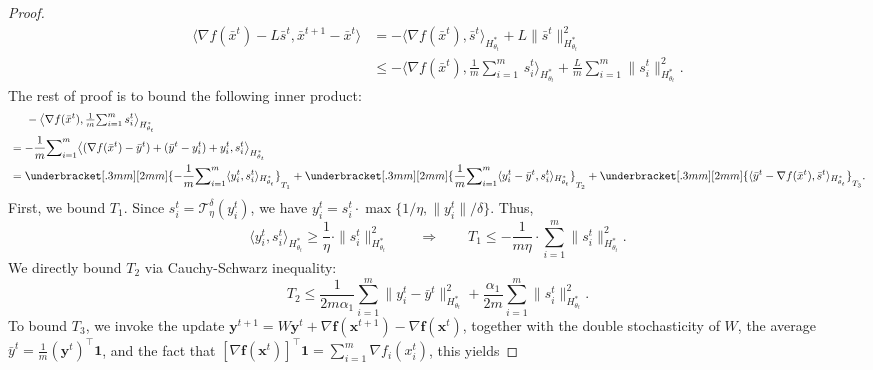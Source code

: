 \documentclass{article}
\theoremstyle{plain}
\theoremstyle{definition}
\theoremstyle{remark}
\newcommand{\clip}{\mathcal{T}^\delta_\eta}
\newcommand{\sL}{L}
\newcommand{\one}{\mathbf{1}}
\newcommand{\bx}{\mathbf{x}}
\newcommand{\by}{\mathbf{y}}
\newcommand{\bff}{\mathbf{f}}
\begin{document}
\begin{proof}
\begin{equation}
        \label{eq:inner product 1}
   \begin{aligned}
     \langle \nabla f(\bar x^t) - \sL \bar s^t, \bar x^{t+1} - \bar x^t \rangle &= 
       -\langle \nabla f(\bar x^t), \bar s^t \rangle_{H_{\theta_t}^*} +  \sL \|\bar s^t\|^2_{H_{\theta_t}^*}\\
       &\leq -\big \langle \nabla f(\bar x^t), \tfrac1m {\textstyle \sum}_{i=1}^m \, s_i^t \big \rangle_{H_{\theta_t}^*} + \frac{\sL}{m}{\sum}_{i=1}^m \|s_i^t\|^2_{H_{\theta_t}^*}.
   \end{aligned}
   \end{equation}
   The rest of proof is to bound the following inner product:
   \begin{equation}
        \label{eq:inner product 2}
        \begin{aligned}
           & \hspace{5mm} -\big \langle \nabla f(\bar x^t), \tfrac1m {\textstyle \sum}_{i=1}^m \, s_i^t \big \rangle_{H_{\theta_t}^*} \\
           &= - \frac1m {\sum}_{i=1}^m 
            \big\langle (\nabla f(\bar x^t) - \bar y^t) + (\bar y^t - y_i^t) + y_i^t , s_i^t \big\rangle_{H_{\theta_t}^*} \\
            &= \underbracket[.3mm][2mm]{- \frac1m {\sum}_{i=1}^m \langle y_i^t , s_i^t\rangle_{H_{\theta_t}^*}}_{T_1} + \underbracket[.3mm][2mm]{\frac1m {\sum}_{i=1}^m \langle y_i^t - \bar y^t, s_i^t \rangle_{H_{\theta_t}^*}}_{T_2} + \underbracket[.3mm][2mm]{\langle \bar y^t - \nabla f(\bar x^t), \bar s^t \rangle_{H_{\theta_t}^*}}_{T_3}.
        \end{aligned}
    \end{equation}
    First, we bound $T_1$. Since $s_i^t=\clip(y_i^t)$, we have $y_i^t=s_i^t\cdot \max\{1/\eta,\|y_i^t\|/\delta\}$. Thus, 
    \begin{equation}
        \label{eq:bound T1}
        \langle y_i^t, s_i^t \rangle_{H_{\theta_t}^*} \geq \frac1\eta \cdot \|s_i^t\|^2_{H_{\theta_t}^*} \qquad \Longrightarrow \qquad T_1 \leq -\frac{1}{m\eta} \cdot {\sum}_{i=1}^m\|s_i^t\|^2_{H_{\theta_t}^*}.
    \end{equation}
We directly bound $T_2$ via Cauchy-Schwarz inequality:
    \begin{equation}
        \label{eq:bound T2}
        T_2 \leq \frac{1}{2m \alpha_1} {\sum}_{i=1}^m\|y_i^t - \bar y^t\|^2_{H_{\theta_t}^*} + \frac{\alpha_1}{2m} {\sum}_{i=1}^m\|s_i^t\|^2_{H_{\theta_t}^*}.
    \end{equation}
    To bound $T_3$, we invoke the update $\by^{t+1} = W \by^t + \nabla \bff(\bx^{t+1}) - \nabla \bff(\bx^{t})$, together with the double stochasticity of $W$, the average $\bar y^t = \frac{1}{m} (\by^t)^\top \one$, and the fact that $[\nabla \bff(\bx^t)]^\top \one = \sum_{i=1}^m \nabla f_i(x_i^t)$, this yields

\end{proof}
\end{document}
